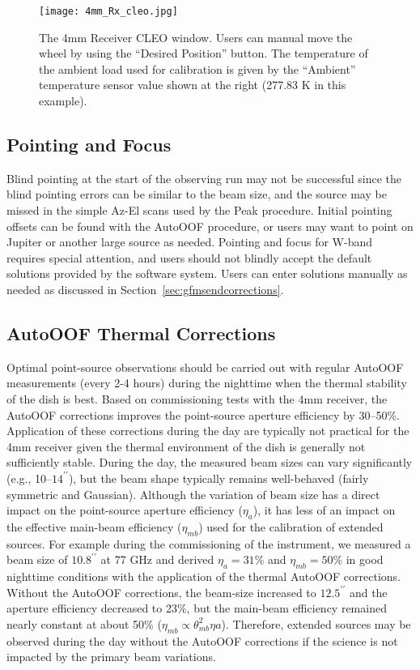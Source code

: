\begin{figure}[!h]
\begin{center}
\texttt{[image: 4mm\_Rx\_cleo.jpg]}
\caption[]{The 4mm Receiver CLEO window.  Users can manual move the
  wheel by using the ``Desired Position'' button.  The temperature of
  the ambient load used for calibration is given by the ``Ambient''
  temperature sensor value shown at the right (277.83 K in this
  example). \label{fig:4mmrxcleo} }
\end{center}
\end{figure}

\subsection{Pointing and Focus}

Blind pointing at the start of the observing run may not be successful
since the blind pointing errors can be similar to the beam size, and the
source may be missed in the simple Az-El scans used by the Peak
procedure.  Initial pointing offsets can be found with the AutoOOF
procedure, or users may want to point on Jupiter or another large
source as needed.  Pointing and focus for W-band requires special
attention, and users should not blindly accept the default solutions
provided by the software system.  Users can enter solutions manually
as needed as discussed in Section~\ref{sec:gfmsendcorrections}.

 
\subsection{AutoOOF Thermal Corrections}

Optimal point-source observations should be carried out with regular
AutoOOF measurements (every 2-4 hours) during the nighttime when the
thermal stability of the dish is best.  Based on commissioning tests
with the 4mm receiver, the AutoOOF corrections improves the
point-source aperture efficiency by 30--50\%.  Application of these
corrections during the day are typically not practical for the 4mm
receiver given the thermal environment of the dish is generally not
sufficiently stable.  During the day, the measured beam sizes can vary
significantly (e.g., 10--$14^{\prime\prime}$), but the beam shape
typically remains well-behaved (fairly symmetric and Gaussian).
Although the variation of beam size has a direct impact on the
point-source aperture efficiency ($\eta_{a}$), it has less of an
impact on the effective main-beam efficiency ($\eta_{mb}$) used for
the calibration of extended sources.  For example during the
commissioning of the instrument, we measured a beam size of
$10.8^{\prime\prime}$ at 77 GHz and derived $\eta_{a} = 31$\% and
$\eta_{mb}=50$\% in good nighttime conditions with the application of
the thermal AutoOOF corrections.  Without the AutoOOF corrections, the
beam-size increased to $12.5^{\prime\prime}$ and the aperture
efficiency decreased to 23\%, but the main-beam efficiency remained
nearly constant at about 50\% ($\eta_{mb} \propto \theta_{mb}^2
\eta{a}$).  Therefore, extended sources may be observed during the day
without the AutoOOF corrections if the science is not impacted by the
primary beam variations.

